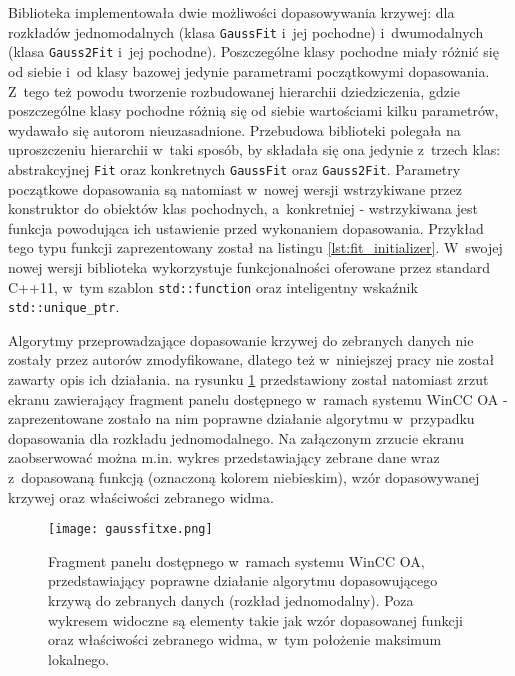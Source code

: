 Biblioteka implementowała dwie możliwości dopasowywania krzywej: dla rozkładów jednomodalnych (klasa \lstinline{GaussFit} i~jej pochodne) i~dwumodalnych (klasa \lstinline{Gauss2Fit} i~jej pochodne). Poszczególne klasy pochodne miały różnić się od siebie i~od klasy bazowej jedynie parametrami początkowymi dopasowania. Z~tego też powodu tworzenie rozbudowanej hierarchii dziedziczenia, gdzie poszczególne klasy pochodne różnią się od siebie wartościami kilku parametrów, wydawało się autorom nieuzasadnione. Przebudowa biblioteki polegała na uproszczeniu hierarchii w~taki sposób, by składała się ona jedynie z~trzech klas: abstrakcyjnej \lstinline{Fit} oraz konkretnych \lstinline{GaussFit} oraz \lstinline{Gauss2Fit}. Parametry początkowe dopasowania są natomiast w~nowej wersji wstrzykiwane przez konstruktor do obiektów klas pochodnych, a~konkretniej - wstrzykiwana jest funkcja powodująca ich ustawienie przed wykonaniem dopasowania. Przykład tego typu funkcji zaprezentowany został na listingu \ref{lst:fit_initializer}. W~swojej nowej wersji biblioteka wykorzystuje funkcjonalności oferowane przez standard C++11, w~tym szablon \lstinline{std::function} oraz inteligentny wskaźnik \lstinline{std::unique_ptr}.



Algorytmy przeprowadzające dopasowanie krzywej do zebranych danych nie zostały przez autorów zmodyfikowane, dlatego też w~niniejszej pracy nie został zawarty opis ich działania. na rysunku \ref{fig:fit_example_good_1} przedstawiony został natomiast zrzut ekranu zawierający fragment panelu dostępnego w~ramach systemu WinCC OA - zaprezentowane zostało na nim poprawne działanie algorytmu w~przypadku dopasowania dla rozkładu jednomodalnego. Na załączonym zrzucie ekranu zaobserwować można m.in. wykres przedstawiający zebrane dane wraz z~dopasowaną funkcją (oznaczoną kolorem niebieskim), wzór dopasowywanej krzywej oraz właściwości zebranego widma.

\begin{figure}[H]
\centering
\texttt{[image: gaussfitxe.png]}
\caption{Fragment panelu dostępnego w~ramach systemu WinCC OA, przedstawiający poprawne działanie algorytmu dopasowującego krzywą do zebranych danych (rozkład jednomodalny). Poza wykresem widoczne są elementy takie jak wzór dopasowanej funkcji oraz właściwości zebranego widma, w~tym położenie maksimum lokalnego.}
\label{fig:fit_example_good_1}
\end{figure}


